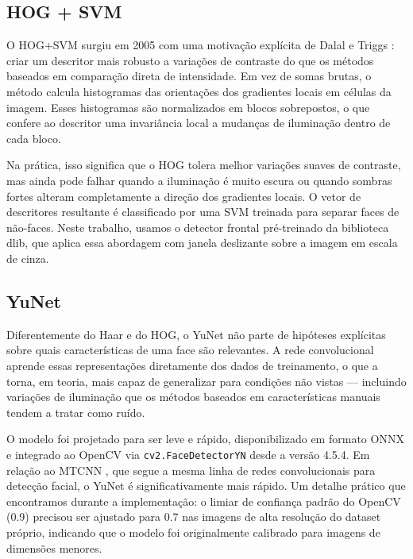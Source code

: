 \documentclass[conference]{IEEEtran}
\begin{document}
\subsection{HOG + SVM}
O HOG+SVM surgiu em 2005 com uma motiva\c{c}\~ao expl\'icita de Dalal e Triggs \cite{DalalTriggs2005}: criar um descritor mais robusto a varia\c{c}\~oes de contraste do que os m\'etodos baseados em compara\c{c}\~ao direta de intensidade. Em vez de somas brutas, o m\'etodo calcula histogramas das orienta\c{c}\~oes dos gradientes locais em c\'elulas da imagem. Esses histogramas s\~ao normalizados em blocos sobrepostos, o que confere ao descritor uma invari\^ancia local a mudan\c{c}as de ilumina\c{c}\~ao dentro de cada bloco.

Na pr\'atica, isso significa que o HOG tolera melhor varia\c{c}\~oes suaves de contraste, mas ainda pode falhar quando a ilumina\c{c}\~ao \'e muito escura ou quando sombras fortes alteram completamente a dire\c{c}\~ao dos gradientes locais. O vetor de descritores resultante \'e classificado por uma SVM treinada para separar faces de n\~ao-faces. Neste trabalho, usamos o detector frontal pr\'e-treinado da biblioteca dlib, que aplica essa abordagem com janela deslizante sobre a imagem em escala de cinza.

\subsection{YuNet}
Diferentemente do Haar e do HOG, o YuNet \cite{Wu2023} n\~ao parte de hip\'oteses expl\'icitas sobre quais caracter\'isticas de uma face s\~ao relevantes. A rede convolucional aprende essas representa\c{c}\~oes diretamente dos dados de treinamento, o que a torna, em teoria, mais capaz de generalizar para condi\c{c}\~oes n\~ao vistas --- incluindo varia\c{c}\~oes de ilumina\c{c}\~ao que os m\'etodos baseados em caracter\'isticas manuais tendem a tratar como ru\'ido.

O modelo foi projetado para ser leve e r\'apido, disponibilizado em formato ONNX e integrado ao OpenCV via \texttt{cv2.FaceDetectorYN} desde a vers\~ao 4.5.4. Em rela\c{c}\~ao ao MTCNN \cite{Zhang2016}, que segue a mesma linha de redes convolucionais para detec\c{c}\~ao facial, o YuNet \'e significativamente mais r\'apido. Um detalhe pr\'atico que encontramos durante a implementa\c{c}\~ao: o limiar de confian\c{c}a padr\~ao do OpenCV (0.9) precisou ser ajustado para 0.7 nas imagens de alta resolu\c{c}\~ao do dataset pr\'oprio, indicando que o modelo foi originalmente calibrado para imagens de dimens\~oes menores.
\end{document}

